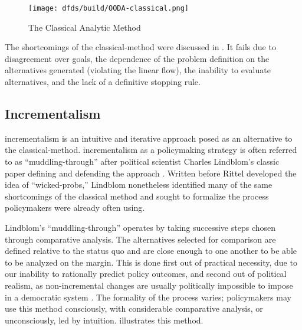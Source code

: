 \begin{figure}[h]
  \centering\CaptionFontSize
  \texttt{[image: dfds/build/OODA-classical.png]}
  \caption{The Classical Analytic Method}
  \label{fig-classical-method}
\end{figure}

The shortcomings of the \ac{classical-method} were discussed in . It fails due to
disagreement over goals, the dependence of the problem definition on the alternatives generated (violating the linear
flow), the inability to evaluate alternatives, and the lack of a definitive stopping rule.

\subsection{Incrementalism}

\Ac{incrementalism} is an intuitive and iterative approach posed as an alternative to the \ac{classical-method}.
\Ac{incrementalism} as a policymaking strategy is often referred to as ``\ac{muddling-through}'' after political
scientist Charles Lindblom's classic paper defining and defending the approach \cite{lindblom_muddling_1959}. Written
before Rittel developed the idea of ``\acp{wicked-prob},'' Lindblom nonetheless identified many of the same shortcomings
of the classical method and sought to formalize the process policymakers were already often using.

Lindblom's ``\ac{muddling-through}'' operates by taking successive steps chosen through comparative analysis. The
alternatives selected for comparison are defined relative to the status quo and are close enough to one another to be
able to be analyzed on the margin. This is done first out of practical necessity, due to our inability to rationally
predict policy outcomes, and second out of political realism, as non-incremental changes are usually politically
impossible to impose in a democratic system \cite{lindblom_muddling_1959}. The formality of the process varies;
policymakers may use this method consciously, with considerable comparative analysis, or unconsciously, led by
intuition.  illustrates this method.



